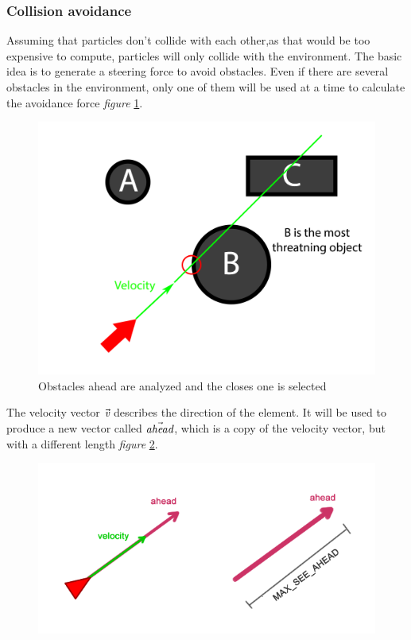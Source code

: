 \subsubsection{Collision avoidance}
Assuming that particles don't collide with each other,as that would be too expensive to compute, particles will only collide with the environment. The basic idea is to generate a steering force to avoid obstacles. Even if there are several obstacles in the environment, only one of them will be used at a time to calculate the avoidance force \emph{figure} \ref{fig:four}.
\begin{figure}
	\includegraphics{CollisionAvoidanceBasis}
	\caption{Obstacles ahead are analyzed and the closes one is selected}
	\label{fig:four}
\end{figure}
The velocity vector $\vec{\emph{v}}$ describes the direction of the element. It will be used to produce a new vector called $\vec{\emph{ahead}}$, which is a copy of the velocity vector, but with a different length \emph{figure} \ref{fig:five}.\\
\begin{figure}
	\includegraphics{vectorahead}
	\caption{}
	\label{fig:five}
\end{figure}

